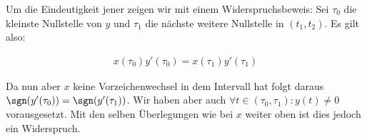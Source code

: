 \begin{solution}
\begin{itemize}
  Um die Eindeutigkeit jener zeigen wir mit einem Widerspruchsbeweis: Sei $\tau_0$
  die kleinste Nullstelle von $y$ und $\tau_1$ die nächste weitere Nullstelle in
  $(t_1 , t_2 )$. Es gilt also:

  \begin{align*}
    x( \tau_0 ) y'( \tau_0 ) = x( \tau_1 ) y'( \tau_1 )
  \end{align*}

  Da nun aber $x$ keine Vorzeichenwechsel in dem Intervall hat folgt daraus
  $\sgn(y^{\prime}(\tau_0)) = \sgn(y^{\prime}(\tau_1))$. Wir haben aber auch
  $\forall t \in (\tau_0,\tau_1): y(t) \neq 0 $ vorausgesetzt. Mit den selben Überlegungen
  wie bei $x$ weiter oben ist dies jedoch ein Widerspruch.
\end{itemize}
\end{solution}
